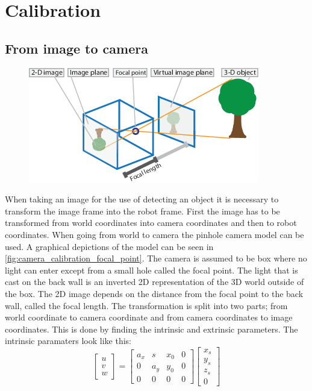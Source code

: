 \chapter{Calibration}

\section{From image to camera}
\begin{figure}[h]
\centering
\includegraphics[width=\textwidth]{figures/camera_calibration_focal_point.PNG}
\caption{}
\label{fig:camera_calibration_focal_point}
\end{figure}
When taking an image for the use of detecting an object it is necessary to transform the image frame into the robot frame. First the image has to be transformed from world coordinates into camera coordinates and then to robot coordinates. When going from world to camera the pinhole camera model can be used. A graphical depictions of the model can be seen in \autoref{fig:camera_calibration_focal_point}. The camera is assumed to be box where no light can enter except from a small hole called the focal point. The light that is cast on the back wall is an inverted 2D representation of the 3D world outside of the box. The 2D image depends on the distance from the focal point to the back wall, called the focal length. The transformation is split into two parts; from world coordinate to camera coordinate and from camera coordinates to image coordinates. This is done by finding the intrinsic and extrinsic parameters. The intrinsic paramaters look like this:
\begin{equation}
\begin{bmatrix}
u \\
v \\
w 
\end{bmatrix} 
 =
\begin{bmatrix}
a_x & s & x_0 & 0 \\
0 & a_y & y_0 & 0 \\
0 & 0 & 0 & 0 
\end{bmatrix}  
\begin{bmatrix}
x_s \\
y_s \\
z_s \\
0 
\end{bmatrix}
\end{equation}
